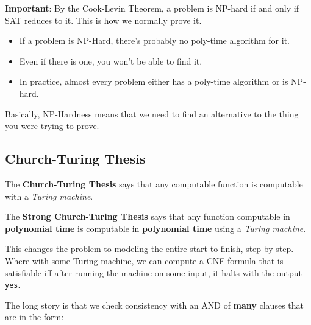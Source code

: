 \documentclass[11pt,fleqn,a4paper,titlepage,dvipsnames,cmyk]{scrartcl}
\begin{document}
\textbf{Important}: By the Cook-Levin Theorem, a problem is NP-hard if and
only if SAT reduces to it. This is how we normally prove it.

\begin{itemize}
    \item If a problem is NP-Hard, there's probably no poly-time algorithm
        for it.
    \item Even if there is one, you won't be able to find it.
    \item In practice, almost every problem either has a poly-time
        algorithm or is NP-hard.
\end{itemize}

Basically, NP-Hardness means that we need to find an alternative to the
thing you were trying to prove.

\subsection{Church-Turing Thesis}%
\label{sub:Church-Turing Thesis}
The \textbf{Church-Turing Thesis} says that any computable function is
computable with a \textit{Turing machine}.

The \textbf{Strong Church-Turing Thesis} says that any function computable
in \textbf{polynomial time} is computable in \textbf{polynomial time}
using a \textit{Turing machine}.

This changes the problem to modeling the entire start to finish, step by
step. Where with some Turing machine, we can compute a CNF formula that is
satisfiable iff after running the machine on some input, it halts with the
output \texttt{yes}.

The long story is that we check consistency with an AND of \textbf{many}
clauses that are in the form:
\begin{align*}
    [P_{i,t} = 1 \wedge S_{3,r=1} \wedge C_{i,T} = 0 \Rightarrow C_{i,r+1} = 1]
\end{align*}
\end{document}
